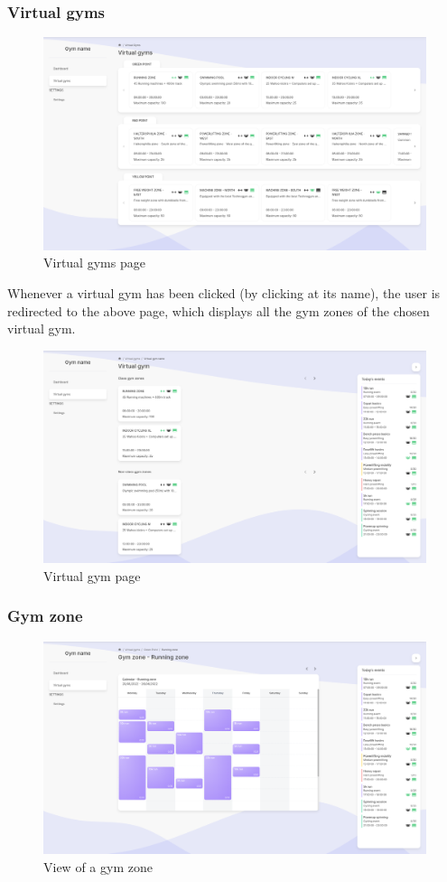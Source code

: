 \documentclass[a4paper, 12pt, oneside]{book}
\begin{document}
\subsubsection{Virtual gyms}
\begin{figure}[H]
	\centering
	\includegraphics[width=\textwidth]{assets/client-screenshots/virtual-gyms.png}
	\caption{Virtual gyms page}
\end{figure}
Whenever a virtual gym has been clicked (by clicking at its name), the user is redirected to the above page, which displays all the gym zones of the chosen virtual gym.
\begin{figure}[H]
	\centering
	\includegraphics[width=\textwidth]{assets/client-screenshots/virtual-gym.png}
	\caption{Virtual gym page}
\end{figure}
\subsubsection{Gym zone}
\begin{figure}[H]
	\centering
	\includegraphics[width=\textwidth]{assets/client-screenshots/gym-zone.png}
	\caption{View of a gym zone}
\end{figure}
\end{document}
